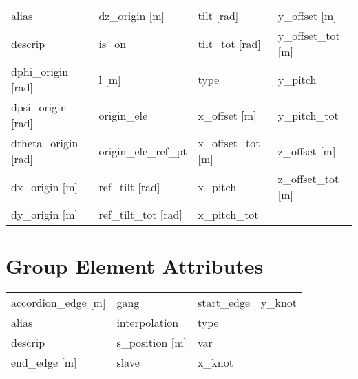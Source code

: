  \begin{tabular}{llll} \toprule
alias                            & dz_origin [m]                    & tilt [rad]                       & y_offset [m]                     \\
descrip                          & is_on                            & tilt_tot [rad]                   & y_offset_tot [m]                 \\
dphi_origin [rad]                & l [m]                            & type                             & y_pitch                          \\
dpsi_origin [rad]                & origin_ele                       & x_offset [m]                     & y_pitch_tot                      \\
dtheta_origin [rad]              & origin_ele_ref_pt                & x_offset_tot [m]                 & z_offset [m]                     \\
dx_origin [m]                    & ref_tilt [rad]                   & x_pitch                          & z_offset_tot [m]                 \\
dy_origin [m]                    & ref_tilt_tot [rad]               & x_pitch_tot                      &                                  \\
 \bottomrule
 \end{tabular}
 \vfill
 
 \section{Group Element Attributes}
 \label{s:list.group}
 
 \begin{tabular}{llll} \toprule
accordion_edge [m]               & gang                             & start_edge                       & y_knot                           \\
alias                            & interpolation                    & type                             &                                  \\
descrip                          & s_position [m]                   & var                              &                                  \\
end_edge [m]                     & slave                            & x_knot                           &                                  \\
 \bottomrule
 \end{tabular}
 \vfill
 

